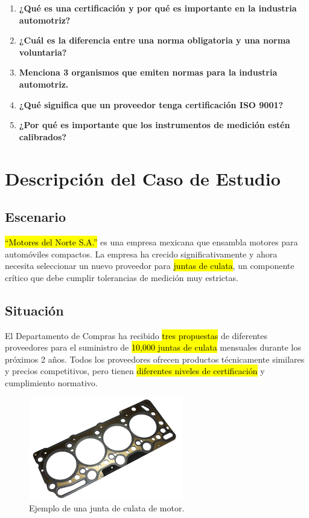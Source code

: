 \documentclass{article}
\begin{document}
\begin{enumerate}
    \item \textbf{¿Qué es una certificación y por qué es importante en la industria automotriz?}
    \item \textbf{¿Cuál es la diferencia entre una norma obligatoria y una norma voluntaria?}
    \item \textbf{Menciona 3 organismos que emiten normas para la industria automotriz.}
    \item \textbf{¿Qué significa que un proveedor tenga certificación ISO 9001?}
    \item \textbf{¿Por qué es importante que los instrumentos de medición estén calibrados?}
\end{enumerate}

\section*{Descripción del Caso de Estudio}

\subsection*{Escenario}

\hl{``Motores del Norte S.A.''} es una empresa mexicana que ensambla motores para automóviles compactos. La empresa ha crecido significativamente y ahora necesita seleccionar un nuevo proveedor para \hl{juntas de culata}, un componente crítico que debe cumplir tolerancias de medición muy estrictas.

\subsection*{Situación}

El Departamento de Compras ha recibido \hl{tres propuestas} de diferentes proveedores para el suministro de \hl{10,000 juntas de culata} mensuales durante los próximos 2 años. Todos los proveedores ofrecen productos técnicamente similares y precios competitivos, pero tienen \hl{diferentes niveles de certificación} y cumplimiento normativo.

\begin{figure}[h!]
    \centering
    \includegraphics[width=0.6\textwidth]{junta-de-culata.png}
    \caption{Ejemplo de una junta de culata de motor.}
    \label{fig:junta_culata}
\end{figure}
\end{document}
